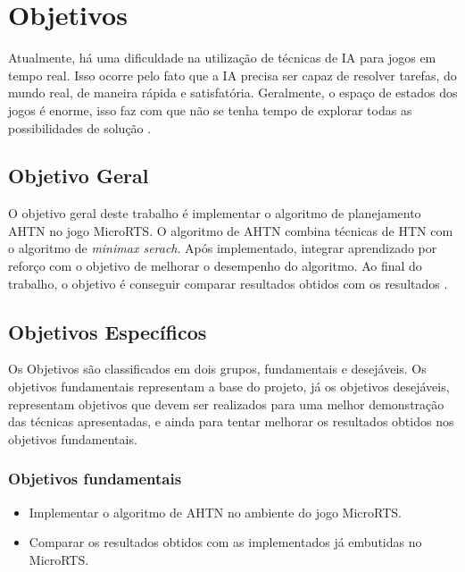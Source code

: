 \chapter{\label{chap:obje}Objetivos}

Atualmente, há uma dificuldade na utilização de técnicas de IA para jogos em tempo real. Isso ocorre pelo fato que a IA precisa ser capaz de resolver tarefas, do mundo real, de maneira rápida e satisfatória. Geralmente, o espaço de estados dos jogos é enorme, isso faz com que não se tenha tempo de explorar todas as possibilidades de solução \cite{millington2009artificial}.   

\section{Objetivo Geral}
O objetivo geral deste trabalho é implementar o algoritmo de planejamento AHTN \cite{ontanon2015adversarial} no jogo MicroRTS. O algoritmo de AHTN combina técnicas de HTN com o algoritmo de \textit{minimax serach}. Após implementado, integrar aprendizado por reforço com o objetivo de melhorar o desempenho do algoritmo. Ao final do trabalho, o objetivo é conseguir comparar resultados obtidos com os resultados \cite{ontanon2012experiments,hogg2010learning,ontanon2013survey}. 

\section{Objetivos Específicos}\label{obj:esp}
Os Objetivos são classificados em dois grupos, fundamentais e desejáveis. Os objetivos fundamentais representam a base do projeto, já os objetivos desejáveis, representam objetivos que devem ser realizados para uma melhor demonstração das técnicas apresentadas, e ainda para tentar melhorar os resultados obtidos nos objetivos fundamentais. 
 
\subsection{Objetivos fundamentais} 
\begin{itemize}
	\item Implementar o algoritmo de AHTN no ambiente do jogo MicroRTS.
	\item Comparar os resultados obtidos com as implementados já embutidas no MicroRTS.
\end{itemize}
 
